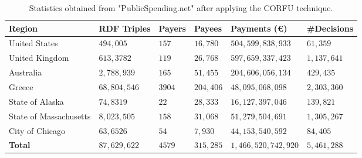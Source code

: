 \documentclass[1p,12pt]{elsarticle}
\begin{document}
\begin{table}[!htb]
	\small
	\renewcommand{\arraystretch}{1}
	\begin{center}
		\begin{tabular}{|p{2cm}|p{2cm}|p{1.5cm}|p{2cm}|p{3cm}|p{2cm}||}
			\hline
			\textbf{Region} & \textbf{RDF Triples} & \textbf{Payers} & \textbf{Payees} & \textbf{Payments (€)} & \textbf{\#Decisions}\\  \hline
			United States &	$494,005$	&	$157$&	$16,780$&	$504,599,838,933$&	$61,359$\\\hline
			United Kingdom	&	$613,3782$	&	$119$	&	$26,768$	&	$597,659,337,423$&	$1,137,641$\\\hline
			Australia &	$2,788,939$	&	$165$	&	$51,455$	&	$204,606,056,134$&	$429,435$\\\hline
			Greece &	$68,804,546$	&	$3904$	&	$204,406$	&	$48,095,068,098$&	$2,303,360$\\\hline
			State of Alaska &	$74,8319$	&	$22$	&	$28,333$	&	$16,127,397,046$&	$139,821$\\\hline
			State of Massachusetts &	$8,023,505$	&	$158$	&	$31,068$	&	$51,279,504,691$& $1,305,267$\\\hline
			City of Chicago &	$63,6526$	&	$54$	&	$7,930$	&	$44,153,540,592$& $84,405$\\\hline
			\hline
			\textbf{Total}  &	$87,629,622$	&	$4579$	&	$315,285$	&	$1,466,520,742,920$& $5,461,288$\\ \hline
			
			
			\hline
		\end{tabular}
		\caption{Statistics obtained from "PublicSpending.net" after applying the CORFU technique.}
		\label{stats-ps}
	\end{center}
\end{table} 
\end{document}
